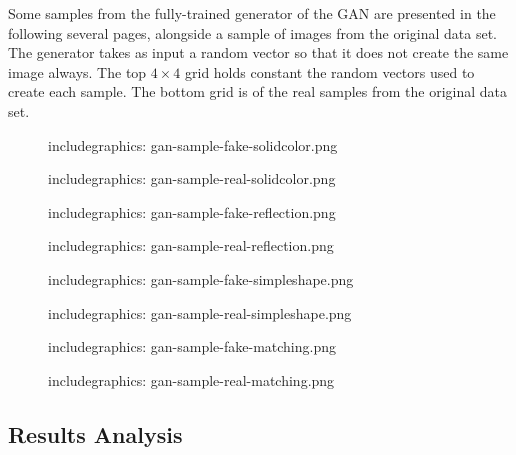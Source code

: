 \documentclass{article}
\newcommand{\tmpincludegraphics}[1][opt]{includegraphics: }
\begin{document}
Some samples from the fully-trained generator of the GAN are presented in the following several pages, alongside a sample of images from the original data set.
The generator takes as input a random vector so that it does not create the same image always.
The top $4 \times 4$ grid holds constant the random vectors used to create each sample.
The bottom grid is of the real samples from the original data set.


\clearpage
{}
\thispagestyle{empty}
\begin{figure}[ht]
\label{fig:gan-samples-solidcolor}
\centering
\tmpincludegraphics[height=323px]{gan-sample-fake-solidcolor.png}
\caption{}
\vspace{1em}
\tmpincludegraphics[height=323px]{gan-sample-real-solidcolor.png}
\end{figure}

\clearpage
\thispagestyle{empty}
\begin{figure}[ht]
\label{fig:gan-samples-reflection}
\centering
\tmpincludegraphics[height=323px]{gan-sample-fake-reflection.png}
\caption{}
\vspace{1em}
\tmpincludegraphics[height=323px]{gan-sample-real-reflection.png}
\end{figure}

\clearpage
\thispagestyle{empty}
\begin{figure}[ht]
\label{fig:gan-samples-simpleshape}
\centering
\tmpincludegraphics[height=323px]{gan-sample-fake-simpleshape.png}
\caption{}
\vspace{1em}
\tmpincludegraphics[height=323px]{gan-sample-real-simpleshape.png}
\end{figure}

\clearpage
\thispagestyle{empty}
\begin{figure}[ht]
\label{fig:gan-samples-matching}
\centering
\tmpincludegraphics[height=323px]{gan-sample-fake-matching.png}
\caption{}
\vspace{1em}
\tmpincludegraphics[height=323px]{gan-sample-real-matching.png}
\end{figure}

\restoregeometry
\pagestyle{plain}

\newpage

\subsection{Results Analysis}
\end{document}
